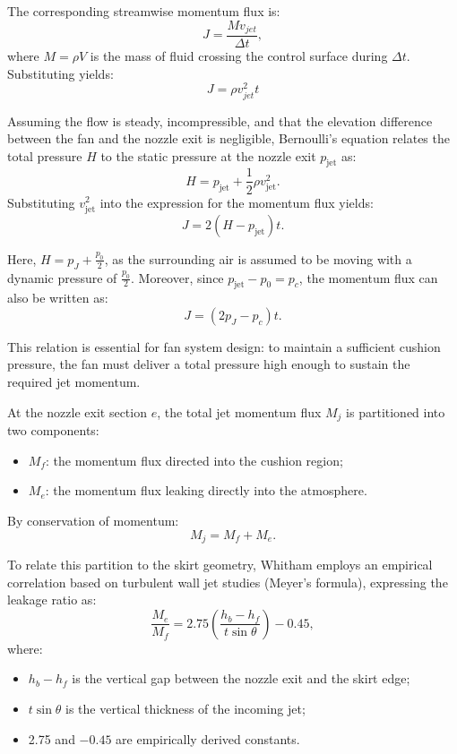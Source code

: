 The corresponding streamwise momentum flux is:
\begin{equation}
J = \frac{M v_{jet}}{\Delta t},
\end{equation}
where \( M = \rho V \) is the mass of fluid crossing the control surface during \( \Delta t \). Substituting yields:
\begin{equation}
J = \rho v_{jet}^2 t
\label{eq:momentum flux}
\end{equation}

Assuming the flow is steady, incompressible, and that the elevation difference between the fan and the nozzle exit is negligible, Bernoulli’s equation relates the total pressure \( H \) to the static pressure at the nozzle exit \( p_{\text{jet}} \) as:
\begin{equation}
H = p_{\text{jet}} + \frac{1}{2} \rho v_{\text{jet}}^2.
\end{equation}
Substituting \( v_{\text{jet}}^2 \) into the expression for the momentum flux yields:
\begin{equation}
J = 2 (H - p_{\text{jet}}) t.
\end{equation}

Here, \( H = p_J + \frac{p_0}{2} \), as the surrounding air is assumed to be moving with a dynamic pressure of \( \frac{p_0}{2} \). Moreover, since \( p_{\text{jet}} - p_0 = p_c \), the momentum flux can also be written as:
\begin{equation}
J = (2p_J - p_c) t. \label{eq:J_p0}
\end{equation}

This relation is essential for fan system design: to maintain a sufficient cushion pressure, the fan must deliver a total pressure high enough to sustain the required jet momentum.

At the nozzle exit section \( e \), the total jet momentum flux \( M_j \) is partitioned into two components:
\begin{itemize}
    \item \( M_f \): the momentum flux directed into the cushion region;
    \item \( M_e \): the momentum flux leaking directly into the atmosphere.
\end{itemize}

By conservation of momentum:
\begin{equation}
M_j = M_f + M_e.
\end{equation}

To relate this partition to the skirt geometry, Whitham employs an empirical correlation based on turbulent wall jet studies (Meyer’s formula), expressing the leakage ratio as:
\begin{equation}
\frac{M_e}{M_f} = 2.75 \left( \frac{h_b - h_f}{t \sin \theta} \right) - 0.45,
\end{equation}
where:
\begin{itemize}
    \item \( h_b - h_f \) is the vertical gap between the nozzle exit and the skirt edge;
    \item \( t \sin \theta \) is the vertical thickness of the incoming jet;
    \item 2.75 and \( -0.45 \) are empirically derived constants.
\end{itemize}

